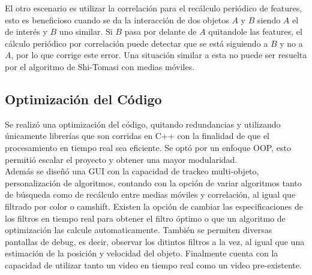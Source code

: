 El otro escenario es utilizar la correlación para el recálculo periódico de features, esto es beneficioso cuando se da la interacción de dos objetos $A$ y $B$ siendo $A$ el de interés y $B$ uno similar. Si $B$ pasa por delante de $A$ quitandole las features, el cálculo periódico por correlación puede detectar que se está siguiendo a $B$ y no a $A$, por lo que corrige este error. Una situación similar a esta no puede ser resuelta por el algoritmo de Shi-Tomasi con medias móviles.


\subsection{Optimización del Código}
Se realizó una optimización del código, quitando redundancias y utilizando únicamente librerías que son corridas en C++ con la finalidad de que el procesamiento en tiempo real sea eficiente. Se optó por un enfoque OOP, esto permitió escalar el proyecto y obtener una mayor modularidad. \\
Además se diseñó una GUI con la capacidad de trackeo multi-objeto, personalización de algoritmos, contando con la opción de variar algoritmos tanto de búsqueda como de recálculo entre medias móviles y correlación, al igual que filtrado por color o camshift. Existen la opción de cambiar las especificaciones de los filtros en tiempo real para obtener el filtro óptimo o que un algoritmo de optimización las calcule automaticamente. También se permiten diversas pantallas de debug, es decir, observar los ditintos filtros a la vez, al igual que una estimación de la posición y velocidad del objeto. Finalmente cuenta con la capacidad de utilizar tanto un video en tiempo real como un video pre-existente.






